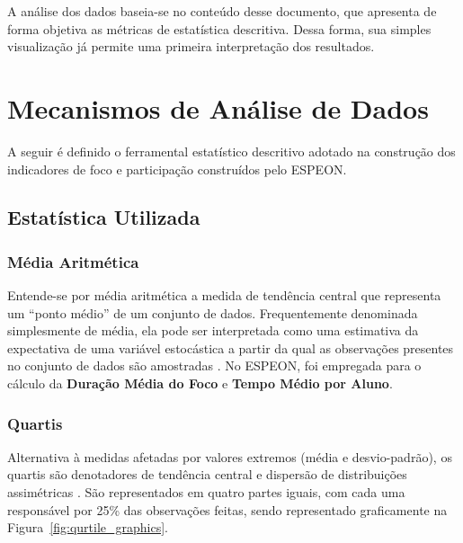 A análise dos dados baseia-se no conteúdo desse documento, que apresenta de forma objetiva as métricas de estatística descritiva. Dessa forma, sua simples visualização já permite uma primeira interpretação dos resultados.





\section{Mecanismos de Análise de Dados}\label{sec:data_analysis_mechanisms}
A seguir é definido o ferramental estatístico descritivo adotado na construção dos indicadores de foco e participação construídos pelo ESPEON.

\subsection{Estatística Utilizada}\label{sub:utilized_statistics}
\subsubsection{Média Aritmética}
Entende-se por média aritmética a medida de tendência central que representa um “ponto médio” de um conjunto de dados. Frequentemente denominada simplesmente de média, ela pode ser interpretada como uma estimativa da expectativa de uma variável estocástica a partir da qual as observações presentes no conjunto de dados são amostradas \cite{wohlinAnalysisInterpretation2000}. No ESPEON, foi empregada para o cálculo da \textbf{Duração Média do Foco} e \textbf{Tempo Médio por Aluno}.

\subsubsection{Quartis}
Alternativa à medidas afetadas por valores extremos (média e desvio-padrão), os quartis são denotadores de tendência central e dispersão de distribuições assimétricas \cite{samapintoEstatisticaBasica2010}. São representados em quatro partes iguais, com cada uma responsável por 25\% das observações feitas, sendo representado graficamente na Figura~\ref{fig:qurtile_graphics}.

